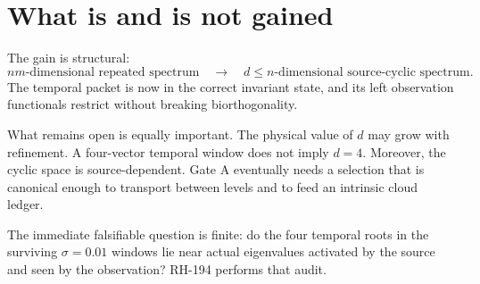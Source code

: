 \documentclass[12pt]{article}
\theoremstyle{remark}
\begin{document}
\section{What is and is not gained}

The gain is structural:
\begin{equation*}
 nm\text{-dimensional repeated spectrum}
 \quad\longrightarrow\quad
 d\le n\text{-dimensional source-cyclic spectrum}.
\end{equation*}
The temporal packet is now in the correct invariant state, and its left
observation functionals restrict without breaking biorthogonality.

What remains open is equally important.  The physical value of $d$ may grow
with refinement.  A four-vector temporal window does not imply $d=4$.
Moreover, the cyclic space is source-dependent.  Gate A eventually needs a
selection that is canonical enough to transport between levels and to feed
an intrinsic cloud ledger.

The immediate falsifiable question is finite: do the four temporal roots in
the surviving $\sigma=0.01$ windows lie near actual eigenvalues activated by
the source and seen by the observation?  RH-194 performs that audit.



\end{document}
